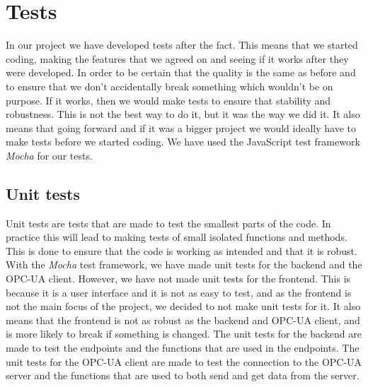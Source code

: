\section{Tests}

In our project we have developed tests after the fact.
This means that we started coding, making the features that we agreed on
and seeing if it works after they were developed.
In order to be certain that the quality is the same as before
and to ensure that we don't accidentally break something which wouldn't be on purpose.
If it works, then we would make tests to ensure that stability and robustness.
This is not the best way to do it, but it was the way we did it.
It also means that going forward and if it was a bigger project
we would ideally have to make tests before we started coding.
We have used the JavaScript test framework \textit{Mocha} for our tests.

\subsection{Unit tests}

Unit tests are tests that are made to test the smallest parts of the code.
In practice this will lead to making tests of small isolated functions and methods.
This is done to ensure that the code is working as intended and that it is robust.
With the \textit{Mocha} test framework, we have made unit tests for the backend and the OPC-UA client.
However, we have not made unit tests for the frontend.
This is because it is a user interface and it is not as easy to test, and as the frontend is not the main focus of the project, we decided to not make unit tests for it.
It also means that the frontend is not as robust as the backend and OPC-UA client, and is more likely to break if something is changed.
The unit tests for the backend are made to test the endpoints and the functions that are used in the endpoints.
The unit tests for the OPC-UA client are made to test the connection to the OPC-UA server and the functions that are used to both send and get data from the server.